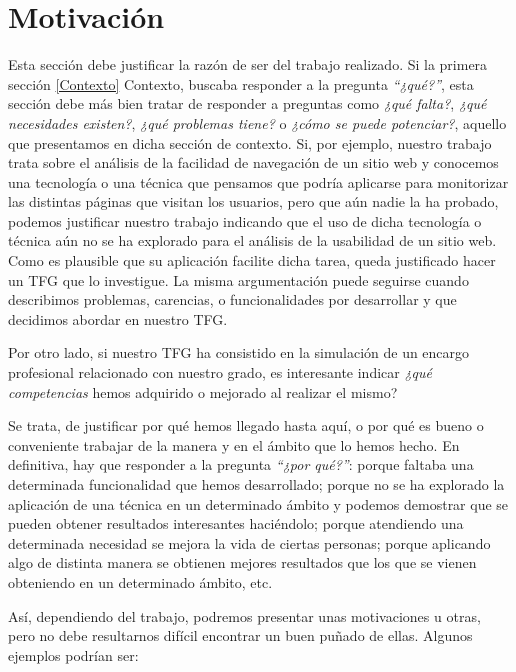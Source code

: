 \section{Motivación}\label{Motivation}
Esta sección debe justificar la razón de ser del trabajo realizado. Si la primera sección \ref{Contexto} Contexto, buscaba responder a la pregunta \textit{``¿qué?''}, esta sección debe más bien tratar de responder a preguntas como \textit{¿qué falta?}, \textit{¿qué necesidades existen?}, \textit{¿qué problemas tiene?} o \textit{¿cómo se puede potenciar?}, aquello que presentamos en dicha sección de contexto. Si, por ejemplo, nuestro trabajo trata sobre el análisis de la facilidad de navegación de un sitio web y conocemos una tecnología o una técnica que pensamos que podría aplicarse para monitorizar las distintas páginas que visitan los usuarios, pero que aún nadie la ha probado, podemos justificar nuestro trabajo indicando que el uso de dicha tecnología o técnica aún no se ha explorado para el análisis de la usabilidad de un sitio web. Como es plausible que su aplicación facilite dicha tarea, queda justificado hacer un TFG que lo investigue. La misma argumentación puede seguirse cuando describimos problemas, carencias, o funcionalidades por desarrollar y que decidimos abordar en nuestro TFG.

Por otro lado, si nuestro TFG ha consistido en la simulación de un encargo profesional relacionado con nuestro grado, es interesante indicar \textit{¿qué competencias} hemos adquirido o mejorado al realizar el mismo?

Se trata, de justificar por qué hemos llegado hasta aquí, o por qué es bueno o conveniente trabajar de la manera y en el ámbito que lo hemos hecho. En definitiva, hay que responder a la pregunta \textit{``¿por qué?''}: porque faltaba una determinada funcionalidad que hemos desarrollado; porque no se ha explorado la aplicación de una técnica en un determinado ámbito y podemos demostrar que se pueden obtener resultados interesantes haciéndolo; porque atendiendo una determinada necesidad se mejora la vida de ciertas personas; porque aplicando algo de distinta manera se obtienen mejores resultados que los que se vienen obteniendo en un determinado ámbito, etc.

Así, dependiendo del trabajo, podremos presentar unas motivaciones u otras, pero no debe resultarnos difícil encontrar un buen puñado de ellas. Algunos ejemplos podrían ser: 

